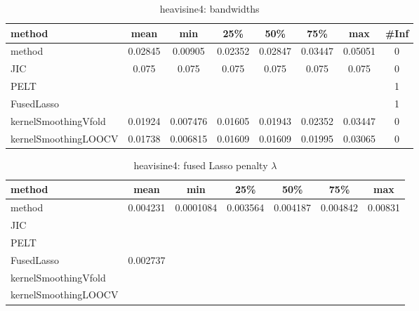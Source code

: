 \begin{table}[ht]
\centering
\begin{tabular}{l|c|ccccc|c}
  \hline
method & mean & min & 25\% & 50\% & 75\% & max & \#Inf \\ 
  \hline
method & 0.02845 & 0.00905 & 0.02352 & 0.02847 & 0.03447 & 0.05051 &   0 \\ 
  JIC & 0.075 & 0.075 & 0.075 & 0.075 & 0.075 & 0.075 &   0 \\ 
  PELT &  &  &  &  &  &  &   1 \\ 
  FusedLasso &  &  &  &  &  &  &   1 \\ 
  kernelSmoothingVfold & 0.01924 & 0.007476 & 0.01605 & 0.01943 & 0.02352 & 0.03447 &   0 \\ 
  kernelSmoothingLOOCV & 0.01738 & 0.006815 & 0.01609 & 0.01609 & 0.01995 & 0.03065 &   0 \\ 
   \hline
\end{tabular}
\caption{heavisine4: bandwidths} 
\label{tab:heavisine4Bandwidths}
\end{table}
\begin{table}[ht]
\centering
\begin{tabular}{l|c|ccccc}
  \hline
method & mean & min & 25\% & 50\% & 75\% & max \\ 
  \hline
method & 0.004231 & 0.0001084 & 0.003564 & 0.004187 & 0.004842 & 0.00831 \\ 
  JIC &  &  &  &  &  &  \\ 
  PELT &  &  &  &  &  &  \\ 
  FusedLasso & 0.002737 &  &  &  &  &  \\ 
  kernelSmoothingVfold &  &  &  &  &  &  \\ 
  kernelSmoothingLOOCV &  &  &  &  &  &  \\ 
   \hline
\end{tabular}
\caption{heavisine4: fused Lasso penalty $\lambda$} 
\label{tab:heavisine4Lambdas}
\end{table}
